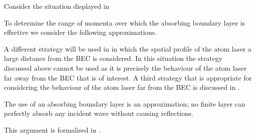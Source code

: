 Consider the situation displayed in 

To determine the range of momenta over which the absorbing boundary layer is effective we consider the following approximations. 


A different strategy will be used in  in which the spatial profile of the atom laser a large distance from the BEC is considered. In this situation the strategy discussed above cannot be used as it is precisely the behaviour of the atom laser far away from the BEC that is of interest. A third strategy that is appropriate for considering the behaviour of the atom laser far from the BEC is discussed in .



The use of an absorbing boundary layer is an approximation; no finite layer can perfectly absorb any incident wave without causing reflections.

This argument is formalised in \citep{Neuhasuer:1989}.